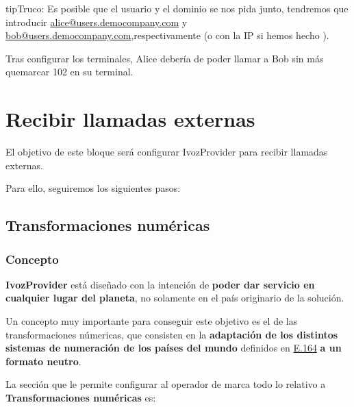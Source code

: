 \documentclass[letterpaper,10pt,spanish]{sphinxmanual}
\begin{document}
\begin{notice}{tip}{Truco:}
Es posible que el usuario y el dominio se nos pida junto, tendremos que introducir \href{mailto:alice@users.democompany.com}{alice@users.democompany.com} y \href{mailto:bob@users.democompany.com}{bob@users.democompany.com},respectivamente (o con la IP si hemos hecho {\hyperref[internal_calls/brand_portal:dnshack]{}}).
\end{notice}

Tras configurar los terminales, Alice debería de poder llamar a Bob sin más quemarcar 102 en su terminal.


\chapter{Recibir llamadas externas}
\label{external_incoming_calls/index::doc}\label{external_incoming_calls/index:receive-external-calls}
El objetivo de este bloque será configurar IvozProvider para recibir llamadas externas.

Para ello, seguiremos los siguientes pasos:


\section{Transformaciones numéricas}
\label{external_incoming_calls/numeric_transformations:id1}\label{external_incoming_calls/numeric_transformations::doc}\label{external_incoming_calls/numeric_transformations:numeric-transformations}

\subsection{Concepto}
\label{external_incoming_calls/numeric_transformations:concept}
\textbf{IvozProvider} está diseñado con la intención de \textbf{poder dar servicio en cualquier lugar del planeta}, no solamente en el país originario de la solución.

Un concepto muy importante para conseguir este objetivo es el de las transformaciones númericas, que consisten en la \textbf{adaptación de los distintos sistemas de numeración de los países del mundo} definidos en \href{https://www.itu.int/rec/T-REC-E.164/es}{E.164} \textbf{a un formato neutro}.

La sección que le permite configurar al operador de marca todo lo relativo a \textbf{Transformaciones numéricas} es:

\end{document}
